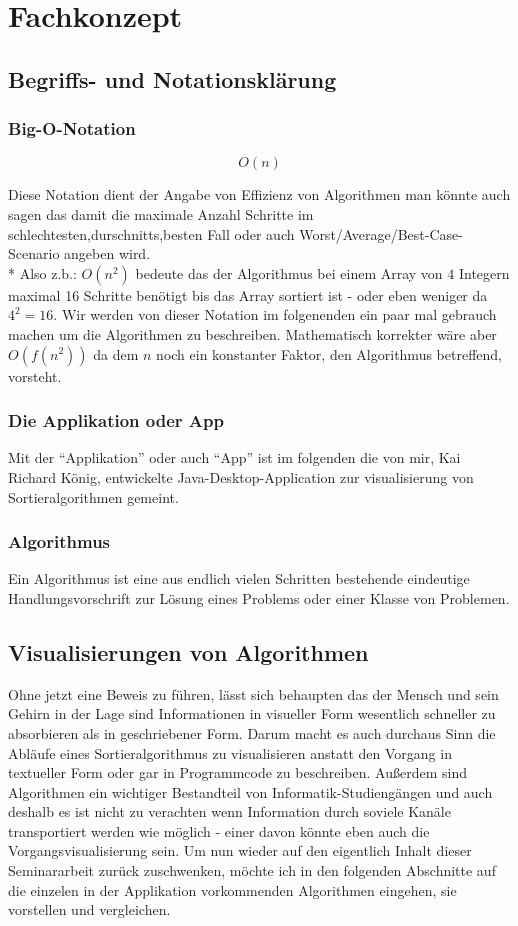 \chapter{Fachkonzept}
\section{Begriffs- und Notationsklärung}
\subsection{Big-O-Notation}
{\Huge{$$ O(n) $$}}

Diese Notation dient der Angabe von Effizienz von Algorithmen man könnte auch sagen das damit
die maximale Anzahl Schritte im schlechtesten,durschnitts,besten Fall oder auch Worst/Average/Best-Case-Scenario angeben wird.\\*
Also z.b.: $O(n^2)$ bedeute das der Algorithmus bei einem Array von $4$ Integern maximal 16 Schritte
benötigt bis das Array sortiert ist - oder eben weniger da $4^2 = 16$.
Wir werden von dieser Notation im folgenenden ein paar mal gebrauch machen um die Algorithmen zu beschreiben.
Mathematisch korrekter wäre aber $O(f(n^2))$ da dem $n$ noch ein konstanter Faktor, den Algorithmus betreffend, vorsteht.
\subsection{Die Applikation oder App}
Mit der "`Applikation"' oder auch "`App"' ist im folgenden die von mir, Kai Richard König, entwickelte Java-Desktop-Application zur visualisierung von 
Sortieralgorithmen gemeint.
\subsection{Algorithmus}
\begin{munquote}
  Ein Algorithmus ist eine aus endlich vielen Schritten bestehende eindeutige Handlungsvorschrift zur Lösung eines Problems 
  oder einer Klasse von Problemen.
\end{munquote}
\section{Visualisierungen von Algorithmen}
 Ohne jetzt eine Beweis zu führen, lässt sich behaupten das der Mensch und sein Gehirn in der Lage sind Informationen in visueller Form
 wesentlich schneller zu absorbieren als in geschriebener Form. Darum macht es auch durchaus Sinn die Abläufe eines Sortieralgorithmus 
 zu visualisieren anstatt den Vorgang in textueller Form oder gar in Programmcode zu beschreiben.
 Außerdem sind Algorithmen ein wichtiger Bestandteil von Informatik-Studiengängen und auch deshalb es ist nicht zu verachten wenn 
 Information durch soviele Kanäle transportiert werden wie möglich - einer davon könnte eben auch die Vorgangsvisualisierung sein.
 Um nun wieder auf den eigentlich Inhalt dieser Seminararbeit zurück zuschwenken, möchte ich in den folgenden Abschnitte auf die einzelen in
 der Applikation vorkommenden Algorithmen eingehen, sie vorstellen und vergleichen. 
 
